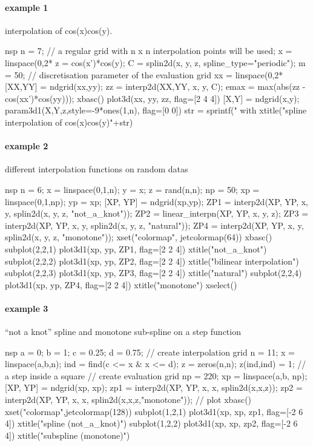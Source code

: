 \begin{examples}
\paragraph{example 1} interpolation of cos(x)cos(y). 
\begin{mintednsp}{nsp}
n = 7;  // a regular grid with n x n interpolation points will be used;
x = linspace(0,2*%
z = cos(x')*cos(y);
C = splin2d(x, y, z, spline_type="periodic");
m = 50; // discretisation parameter of the evaluation grid
xx = linspace(0,2*%
[XX,YY] = ndgrid(xx,yy);
zz = interp2d(XX,YY, x, y, C);
emax = max(abs(zz - cos(xx')*cos(yy)));
xbasc()
plot3d(xx, yy, zz, flag=[2 4 4])
[X,Y] = ndgrid(x,y);
param3d1(X,Y,z,style=-9*ones(1,n), flag=[0 0])
str = sprintf(" with %
xtitle("spline interpolation of cos(x)cos(y)"+str)
\end{mintednsp}

\paragraph{example 2} different interpolation functions on random datas
\begin{mintednsp}{nsp}
n = 6;
x = linspace(0,1,n); y = x;
z = rand(n,n);
np = 50;
xp = linspace(0,1,np); yp = xp;
[XP, YP] = ndgrid(xp,yp);
ZP1 = interp2d(XP, YP, x, y, splin2d(x, y, z, "not_a_knot"));
ZP2 = linear_interpn(XP, YP, x, y, z);
ZP3 = interp2d(XP, YP, x, y, splin2d(x, y, z, "natural"));
ZP4 = interp2d(XP, YP, x, y, splin2d(x, y, z, "monotone"));
xset("colormap", jetcolormap(64))
xbasc()
subplot(2,2,1)
   plot3d1(xp, yp, ZP1, flag=[2 2 4])
   xtitle("not_a_knot")
subplot(2,2,2)
   plot3d1(xp, yp, ZP2, flag=[2 2 4])
   xtitle("bilinear interpolation")
subplot(2,2,3)
   plot3d1(xp, yp, ZP3, flag=[2 2 4])
   xtitle("natural")
subplot(2,2,4)
   plot3d1(xp, yp, ZP4, flag=[2 2 4])
   xtitle("monotone")
xselect()
\end{mintednsp}

\paragraph{example 3} ``not a knot'' spline and monotone sub-spline on a step function
\begin{mintednsp}{nsp}
a = 0; b = 1; c = 0.25; d = 0.75;
// create interpolation grid
n = 11;
x = linspace(a,b,n);
ind = find(c <= x  &  x <= d); 
z = zeros(n,n); z(ind,ind) = 1;  // a step inside a square
// create evaluation grid
np = 220;
xp = linspace(a,b, np);
[XP, YP] = ndgrid(xp, xp);
zp1 = interp2d(XP, YP, x, x, splin2d(x,x,z));
zp2 = interp2d(XP, YP, x, x, splin2d(x,x,z,"monotone"));
// plot
xbasc()
xset("colormap",jetcolormap(128))
subplot(1,2,1)
   plot3d1(xp, xp, zp1, flag=[-2 6 4])
   xtitle("spline (not_a_knot)")
subplot(1,2,2)
   plot3d1(xp, xp, zp2, flag=[-2 6 4])
   xtitle("subspline (monotone)")
\end{mintednsp}

\end{examples}


